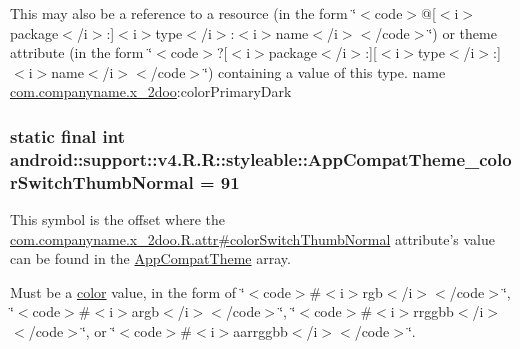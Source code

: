 This may also be a reference to a resource (in the form \char`\"{}$<$code$>$@\mbox{[}$<$i$>$package$<$/i$>$:\mbox{]}$<$i$>$type$<$/i$>$:$<$i$>$name$<$/i$>$$<$/code$>$\char`\"{}) or theme attribute (in the form \char`\"{}$<$code$>$?\mbox{[}$<$i$>$package$<$/i$>$:\mbox{]}\mbox{[}$<$i$>$type$<$/i$>$:\mbox{]}$<$i$>$name$<$/i$>$$<$/code$>$\char`\"{}) containing a value of this type.  name \hyperlink{namespacecom_1_1companyname_1_1x__2doo}{com.companyname.x\_\-2doo}:colorPrimaryDark \hypertarget{classandroid_1_1support_1_1v4_1_1_r_1_1styleable_6ea63f1233fe0a7b2a627bae8dbdb446}{
\subsubsection[{AppCompatTheme\_\-colorSwitchThumbNormal}]{\setlength{\rightskip}{0pt plus 5cm}static final int android::support::v4.R.R::styleable::AppCompatTheme\_\-colorSwitchThumbNormal = 91}}
\label{classandroid_1_1support_1_1v4_1_1_r_1_1styleable_6ea63f1233fe0a7b2a627bae8dbdb446}


This symbol is the offset where the \hyperlink{classcom_1_1companyname_1_1x__2doo_1_1_r_1_1attr_1e1b901072bbc103b0d955570196a458}{com.companyname.x\_\-2doo.R.attr\#colorSwitchThumbNormal} attribute's value can be found in the \hyperlink{classandroid_1_1support_1_1v4_1_1_r_1_1styleable_0873e92ba21076bb5a4aeadeb7f5779f}{AppCompatTheme} array.

Must be a \hyperlink{classandroid_1_1support_1_1v4_1_1_r_1_1color}{color} value, in the form of \char`\"{}$<$code$>$\#$<$i$>$rgb$<$/i$>$$<$/code$>$\char`\"{}, \char`\"{}$<$code$>$\#$<$i$>$argb$<$/i$>$$<$/code$>$\char`\"{}, \char`\"{}$<$code$>$\#$<$i$>$rrggbb$<$/i$>$$<$/code$>$\char`\"{}, or \char`\"{}$<$code$>$\#$<$i$>$aarrggbb$<$/i$>$$<$/code$>$\char`\"{}. 

